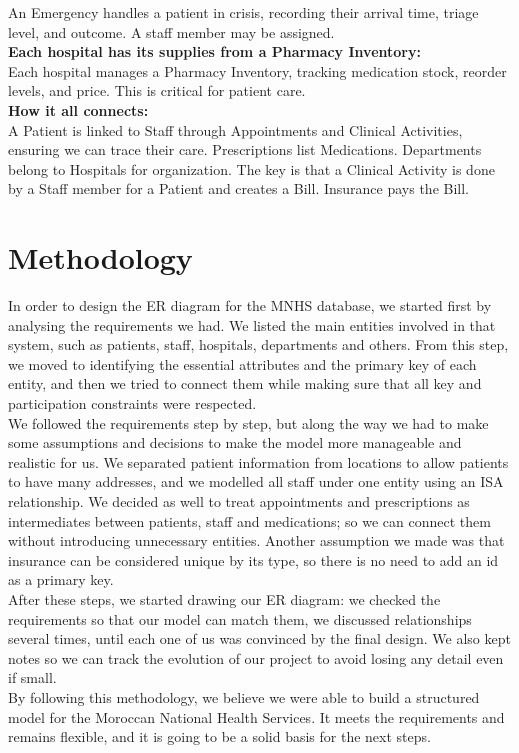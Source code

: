 \documentclass[a4paper,12pt]{article}
\begin{document}
An Emergency handles a patient in crisis, recording their arrival time, triage level, and outcome. A staff member may be assigned.
\\
\textbf{\color{blue}Each hospital has its supplies from a Pharmacy Inventory:}\\
Each hospital manages a Pharmacy Inventory, tracking medication stock, reorder levels, and price. This is critical for patient care.\\
\textbf{\color{red}How it all connects:}\\
A Patient is linked to Staff through Appointments and Clinical Activities, ensuring we can trace their care. Prescriptions list Medications. Departments belong to Hospitals for organization. The key is that a Clinical Activity is done by a Staff member for a Patient and creates a Bill. Insurance pays the Bill.

\section{Methodology}
In order to design the ER diagram for the MNHS database, we started first by analysing the requirements we had. We listed the main entities involved in that system, such as patients, staff, hospitals, departments and others. From this step, we moved to identifying the essential attributes and the primary key of each entity, and then we tried to connect them while making sure that all key and participation constraints were respected.\\
We followed the requirements step by step, but along the way we had to make some assumptions and decisions to make the model more manageable and realistic for us. We separated patient information from locations to allow patients to have many addresses, and we modelled all staff under one entity using an ISA relationship. We decided as well to treat appointments and prescriptions as intermediates between patients, staff and medications; so we can connect them without introducing unnecessary entities. Another assumption we made was that insurance can be considered unique by its type, so there is no need to add an id as a primary key.\\
After these steps, we started drawing our ER diagram: we checked the requirements so that our model can match them, we discussed relationships several times, until each one of us was convinced by the final design. We also kept notes so we can track the evolution of our project to avoid losing any detail even if small.\\
By following this methodology, we believe we were able to build a structured model for the Moroccan National Health Services. It meets the requirements and remains flexible, and it is going to be a solid basis for the next steps.
\end{document}
